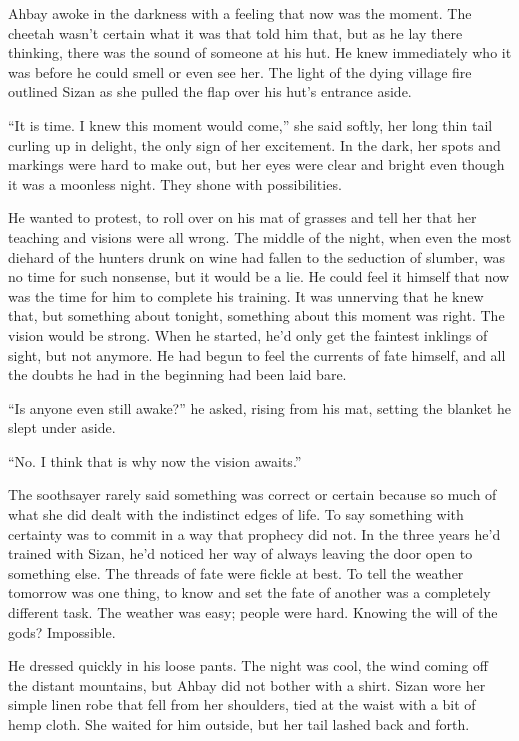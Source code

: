 Ahbay awoke in the darkness with a feeling that now was the moment. The cheetah wasn't certain what it was that told him that, but as he lay there thinking, there was the sound of someone at his hut. He knew immediately who it was before he could smell or even see her. The light of the dying village fire outlined Sizan as she pulled the flap over his hut's entrance aside.

``It is time. I knew this moment would come,'' she said softly, her long thin tail curling up in delight, the only sign of her excitement. In the dark, her spots and markings were hard to make out, but her eyes were clear and bright even though it was a moonless night. They shone with possibilities.

He wanted to protest, to roll over on his mat of grasses and tell her that her teaching and visions were all wrong. The middle of the night, when even the most diehard of the hunters drunk on wine had fallen to the seduction of slumber, was no time for such nonsense, but it would be a lie. He could feel it himself that now was the time for him to complete his training. It was unnerving that he knew that, but something about tonight, something about this moment was right. The vision would be strong. When he started, he'd only get the faintest inklings of sight, but not anymore. He had begun to feel the currents of fate himself, and all the doubts he had in the beginning had been laid bare.

``Is anyone even still awake?'' he asked, rising from his mat, setting the blanket he slept under aside.

``No. I think that is why now the vision awaits.''

The soothsayer rarely said something was correct or certain because so much of what she did dealt with the indistinct edges of life. To say something with certainty was to commit in a way that prophecy did not. In the three years he'd trained with Sizan, he'd noticed her way of always leaving the door open to something else. The threads of fate were fickle at best. To tell the weather tomorrow was one thing, to know and set the fate of another was a completely different task. The weather was easy; people were hard. Knowing the will of the gods? Impossible.

He dressed quickly in his loose pants. The night was cool, the wind coming off the distant mountains, but Ahbay did not bother with a shirt. Sizan wore her simple linen robe that fell from her shoulders, tied at the waist with a bit of hemp cloth. She waited for him outside, but her tail lashed back and forth.

